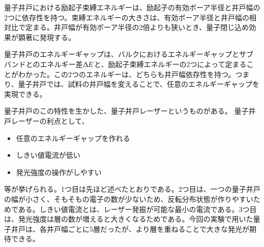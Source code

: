 \documentclass[11pt,a4j]{jsarticle}
\begin{document}
\begin{enumerate}
       量子井戸における励起子束縛エネルギーは、励起子の有効ボーア半径と井戸幅の2つに依存性を持つ。束縛エネルギーの大きさは、有効ボーア半径と井戸幅の相対比で定まる\cite{bohr}。井戸幅が有効ボーア半径の2倍よりも狭いとき、量子閉じ込め効果が顕著に発現する。




       量子井戸のエネルギーギャップは、バルクにおけるエネルギーギャップとサブバンドとのエネルギー差$\Updelta E$と、励起子束縛エネルギーの2つによって定まることがわかった。この2つのエネルギーは、どちらも井戸幅依存性を持つ。つまり、量子井戸では、試料の井戸幅を変えることで、任意のエネルギーギャップを実現できる。

       量子井戸のこの特性を生かした、量子井戸レーザーというものがある。%
       量子井戸レーザーの利点として、
       \begin{itemize}
        \item 任意のエネルギーギャップを作れる
        \item しきい値電流が低い
        \item 発光強度の操作がしやすい
       \end{itemize}
       等が挙げられる。1つ目は先ほど述べたとおりである。2つ目は、一つの量子井戸の幅が小さく、そもそもの電子の数が少ないため、反転分布状態が作りやすいためである。しきい値電流とは、レーザー発振が可能な最小の電流である。3つ目は、発光強度は層の数が増えると大きくなるためである。今回の実験で用いた量子井戸は、各井戸幅ごとに5層だったが、より層を重ねることで大きな発光が期待できる。


\end{enumerate}
\end{document}
